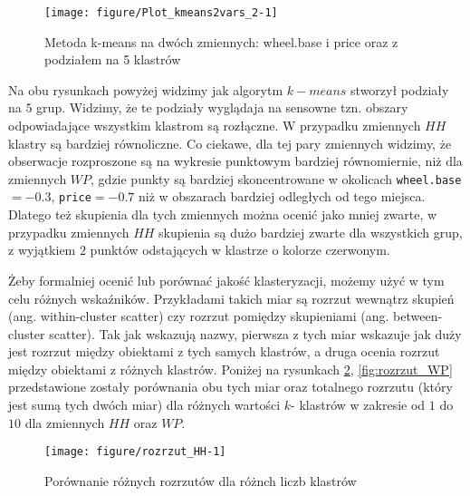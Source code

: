 \documentclass[12pt, a4paper]{article}\usepackage[]{graphicx}\usepackage[]{xcolor}
\makeatletter
\def\maxwidth{ %
  \ifdim\Gin@nat@width>\linewidth
    \linewidth
  \else
    \Gin@nat@width
  \fi
}
\newenvironment{knitrout}{}{} %
\makeatother
\begin{document}
\begin{knitrout}
\color{fgcolor}\begin{figure}[H]

{\centering \texttt{[image: figure/Plot\_kmeans2vars\_2-1]} 

}

\caption[Metoda k-means na dwóch zmiennych]{Metoda k-means na dwóch zmiennych: wheel.base i price oraz z podziałem na 5 klastrów}\label{fig:Plot_kmeans2vars_2}
\end{figure}

\end{knitrout}

Na obu rysunkach powyżej widzimy jak algorytm $k-means$ stworzył podziały na $5$ grup. Widzimy, że te podziały wyglądaja na sensowne tzn. obszary odpowiadające wszystkim klastrom są rozłączne. W przypadku zmiennych $HH$ klastry są bardziej równoliczne. Co ciekawe, dla tej pary zmiennych widzimy, że obserwacje rozproszone są na wykresie punktowym bardziej równomiernie, niż dla zmiennych $WP$, gdzie punkty są bardziej skoncentrowane w okolicach \texttt{wheel.base}$=-0.3$, \texttt{price}$=-0.7$ niż w obszarach bardziej odległych od tego miejsca. Dlatego też skupienia dla tych zmiennych można ocenić jako mniej zwarte, w przypadku zmiennych $HH$ skupienia są dużo bardziej zwarte dla wszystkich grup, z wyjątkiem $2$ punktów odstających w klastrze o kolorze czerwonym.
\par
Żeby formalniej ocenić lub porównać jakość klasteryzacji, możemy użyć w tym celu różnych wskaźników. Przykładami takich miar są rozrzut wewnątrz skupień (ang. within-cluster scatter) czy rozrzut pomiędzy skupieniami (ang. between-cluster scatter). Tak jak wskazują nazwy, pierwsza z tych miar wskazuje jak duży jest rozrzut między obiektami z tych samych klastrów, a druga ocenia rozrzut między obiektami z różnych klastrów. Poniżej na rysunkach \ref{fig:rozrzut_HH}, \ref{fig:rozrzut_WP} przedstawione zostały porównania obu tych miar oraz totalnego rozrzutu (który jest sumą tych dwóch miar) dla różnych wartości $k$- klastrów w zakresie od $1$ do $10$ dla zmiennych $HH$ oraz $WP$.
\begin{knitrout}
\color{fgcolor}\begin{figure}[H]

{\centering \texttt{[image: figure/rozrzut\_HH-1]} 

}

\caption[Porównanie różnych rozrzutów dla różnch liczb klastrów]{Porównanie różnych rozrzutów dla różnch liczb klastrów}\label{fig:rozrzut_HH}
\end{figure}

\end{knitrout}
\end{document}
